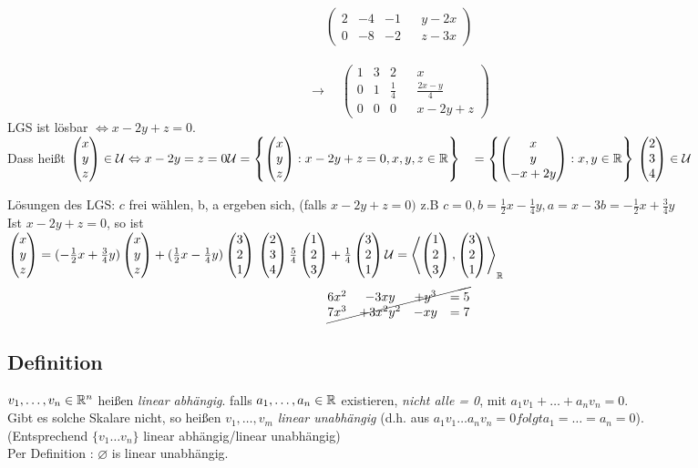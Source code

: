 \begin{enumerate}[a)]
\[\begin{pmatrix}
2&-4&-1&&y-2x\\
0&-8&-2&&z-3x
\end{pmatrix}   \]\\
\[\to\quad\begin{pmatrix}
1&3&2&&x\\
0&1&\frac14&&\frac{2x-y}4\\
0&0&0&&x-2y+z
\end{pmatrix} \]
LGS ist lösbar $\Leftrightarrow x-2y+z=0$.\\
Dass hei\ss t $\vektor{x}{y}{z} \in \U \Leftrightarrow x -2y = z =0\\
\U = \left\{ \vektor{x}{y}{z} : x-2y+z=0,x,y,z\in\R \right\}\\
\phantom{\U}= \left\{ \vektor{x}{y}{-x+2y} : x,y\in\R \right\}\\
\vektor{2}{3}{4}\in\U$
\end{enumerate}
Lösungen des LGS: $c$ frei wählen, b, a ergeben sich, (falls $x-2y + z = 0)$ z.B $c = 0, b = \frac12x-\frac14y, a = x-3b = -\frac12x + \frac34y$\\
Ist $\mathit{x-2y+z=0}$, so ist\\ $\begin{pmatrix} x\\y\\z \end{pmatrix} = (-\frac12x+\frac34y)\begin{pmatrix} x\\y\\z \end{pmatrix}+ (\frac12x - \frac14y)\begin{pmatrix} 3\\2\\1 \end{pmatrix}\\
\begin{pmatrix} 2\\3\\4 \end{pmatrix}\frac54\begin{pmatrix} 1\\2\\3 \end{pmatrix}+\frac14\begin{pmatrix} 3\\2\\1 \end{pmatrix}\\
\mathcal{U}= \left\langle\begin{pmatrix} 1\\2\\3 \end{pmatrix}, \begin{pmatrix} 3\\2\\1 \end{pmatrix} \right\rangle_{\mathbb{R}}$
\[\cancel{\begin{matrix}
6x^2&- 3xy&+y^3 &=5\\
7x^3&+ 3x^2y^2&-xy&=7
\end{matrix}} \]
\setcounter{subsection}{8}
\subsection{Definition}\label{sec:0.9}
$v_1,\ldots,v_n \in \mathbb{R}^n$ hei\ss en \emph{linear abhängig}. falls
$a_1,\ldots,a_n \in \mathbb{R}$ existieren, \emph{nicht alle = 0}, mit $a_1v_1 + \ldots +a_nv_n = 0$.\\
Gibt es solche Skalare nicht, so heißen $v_1,\ldots,v_m$ \emph{linear unabhängig} (d.h. aus $a_1v_1\ldots a_nv_n = 0 folgt a_1 = \ldots = a_n = 0$).\\
(Entsprechend $\{ v_1\ldots v_n \}$ linear abhängig/linear unabhängig)\\
Per Definition : $\varnothing$ is linear unabhängig.\\
